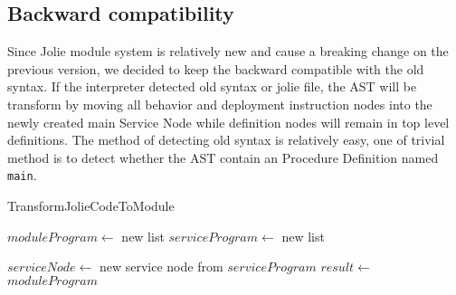 \subsection{Backward compatibility}

Since Jolie module system is relatively new and cause a breaking change on the previous version, we decided to keep the backward compatible with the old syntax. If the interpreter detected old syntax or jolie file, the AST will be transform by moving all behavior and deployment instruction nodes into the newly created main Service Node while definition nodes will remain in top level definitions. The method of detecting old syntax is relatively easy, one of trivial method is to detect whether the AST contain an Procedure Definition named \texttt{main}.

\begin{algorithm}[h]
    \caption{TransformJolieCodeToModule}
    \label{algo:transfrom}
    \begin{algorithmic}[1]

        \State $moduleProgram\gets$ new list
        \State $serviceProgram\gets$ new list

        \State {}
        \Else
        \State {}
        \EndIf
        \EndIf
        \EndFor
        \State $serviceNode \gets$ new service node from $serviceProgram$
        \State {}
        \State $result \gets$ $moduleProgram$
        \EndProcedure

    \end{algorithmic}
\end{algorithm}